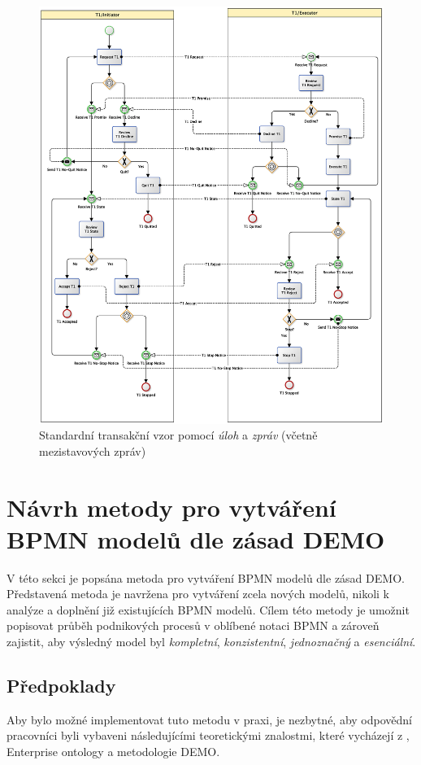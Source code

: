 \begin{figure}[htbp]
\centering
\includegraphics[width=\textwidth,height=\textheight,keepaspectratio]{obrazky/transaction-standard-messages}
\caption{Standardní transakční vzor pomocí \textit{úloh} a \textit{zpráv} (včetně mezistavových zpráv)}
\label{fig:St_trans_ulohy_zpravy_mezistav}
\end{figure}

\section{Návrh metody pro vytváření BPMN modelů dle zásad DEMO}
V této sekci je popsána metoda pro vytváření BPMN modelů dle zásad DEMO. Představená metoda je navržena pro vytváření zcela nových modelů, nikoli k analýze a doplnění již existujících BPMN modelů. Cílem této metody je umožnit popisovat průběh podnikových procesů v oblíbené notaci BPMN a zároveň zajistit, aby výsledný model byl \textit{kompletní}, \textit{konzistentní}, \textit{jednoznačný} a \textit{esenciální}.

\subsection{Předpoklady}
Aby bylo možné implementovat tuto metodu v praxi, je nezbytné, aby odpovědní pracovníci byli vybaveni následujícími teoretickými znalostmi, které vycházejí z \ptheory{}, Enterprise ontology a metodologie DEMO.

